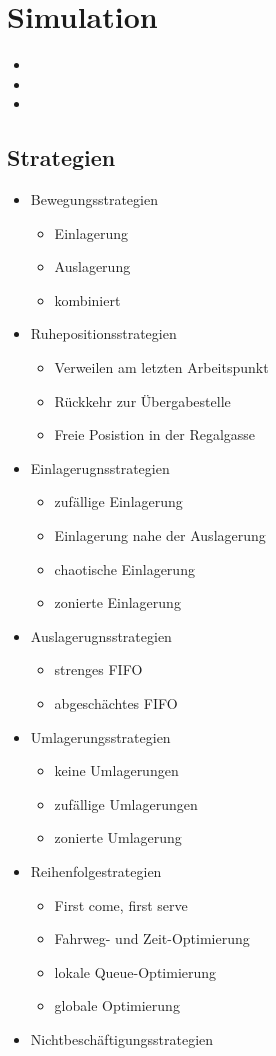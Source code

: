 \section{Simulation}


\begin{itemize}
  \item 
  \item
  \item
\end{itemize}


\subsection{Strategien}
\begin{itemize}
 \item Bewegungsstrategien
 \begin{itemize}
  \item Einlagerung
  \item Auslagerung
  \item kombiniert
\end{itemize}
 \item Ruhepositionsstrategien
 \begin{itemize}
  \item Verweilen am letzten Arbeitspunkt
  \item Rückkehr zur Übergabestelle
  \item Freie Posistion in der Regalgasse
\end{itemize}
 \item Einlagerugnsstrategien
 \begin{itemize}
  \item zufällige Einlagerung
  \item Einlagerung nahe der Auslagerung
  \item chaotische Einlagerung
  \item zonierte Einlagerung
\end{itemize}
 \item Auslagerugnsstrategien
 \begin{itemize}
  \item strenges FIFO
  \item abgeschächtes FIFO
\end{itemize}
 \item Umlagerungsstrategien
 \begin{itemize}
  \item keine Umlagerungen
  \item zufällige Umlagerungen
  \item zonierte Umlagerung
\end{itemize}
 \item Reihenfolgestrategien
 \begin{itemize}
  \item First come, first serve
  \item Fahrweg- und Zeit-Optimierung
  \item lokale Queue-Optimierung
  \item globale Optimierung
\end{itemize}
 \item Nichtbeschäftigungsstrategien
\end{itemize}

